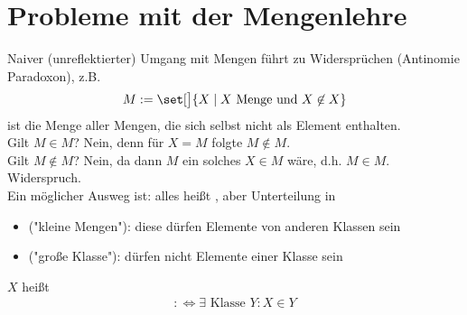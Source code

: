\section{Probleme mit der Mengenlehre}
Naiver (unreflektierter) Umgang mit Mengen führt zu Widersprüchen (Antinomie Paradoxon), z.B.
\begin{align*}
	M:=\set[\big]{X\mid X\text{ Menge und }X\not\in X}
\end{align*}
ist die Menge aller Mengen, die sich selbst nicht als Element enthalten.\\
Gilt $M\in M$?
Nein, denn für $X=M$ folgte $M\not\in M$.\\
Gilt $M\not\in M$? Nein, da dann $M$ ein solches $X\in M$ wäre, d.h. $M\in M$.
Widerspruch.\\
Ein möglicher Ausweg ist: alles heißt , aber Unterteilung in
\begin{itemize}
	\item {} ("kleine Mengen"): diese dürfen Elemente von anderen Klassen sein
	\item {} ("große Klasse"): dürfen nicht Elemente einer Klasse sein
\end{itemize}

\begin{definition} %
	$X$ heißt 
	\begin{align*}
		:\iff\exists\text{ Klasse }Y:X\in Y
	\end{align*}
\end{definition}

